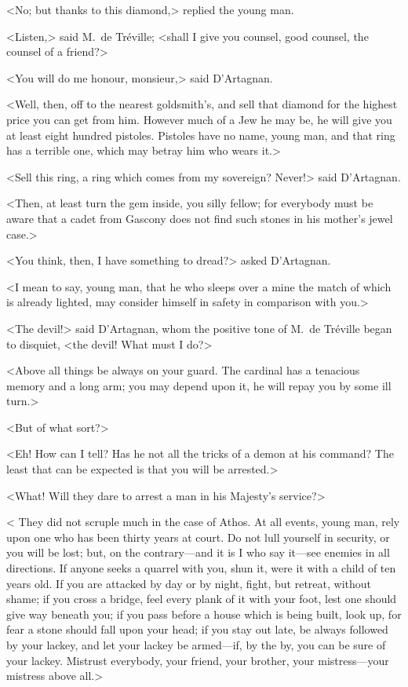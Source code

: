 <No; but thanks to this diamond,> replied the young man. 

<Listen,> said M.~de Tréville; <shall I give you counsel, good counsel, the counsel of a friend?> 

<You will do me honour, monsieur,> said D'Artagnan. 

<Well, then, off to the nearest goldsmith's, and sell that diamond for the highest price you can get from him. However much of a Jew he may be, he will give you at least eight hundred pistoles. Pistoles have no name, young man, and that ring has a terrible one, which may betray him who wears it.> 

<Sell this ring, a ring which comes from my sovereign? Never!> said D'Artagnan. 

<Then, at least turn the gem inside, you silly fellow; for everybody must be aware that a cadet from Gascony does not find such stones in his mother's jewel case.> 

<You think, then, I have something to dread?> asked D'Artagnan. 

<I mean to say, young man, that he who sleeps over a mine the match of which is already lighted, may consider himself in safety in comparison with you.> 

<The devil!> said D'Artagnan, whom the positive tone of M.~de Tréville began to disquiet, <the devil! What must I do?> 

<Above all things be always on your guard. The cardinal has a tenacious memory and a long arm; you may depend upon it, he will repay you by some ill turn.> 

<But of what sort?> 

<Eh! How can I tell? Has he not all the tricks of a demon at his command? The least that can be expected is that you will be arrested.> 

<What! Will they dare to arrest a man in his Majesty's service?> 

< They did not scruple much in the case of Athos. At all events, young man, rely upon one who has been thirty years at court. Do not lull yourself in security, or you will be lost; but, on the contrary—and it is I who say it—see enemies in all directions. If anyone seeks a quarrel with you, shun it, were it with a child of ten years old. If you are attacked by day or by night, fight, but retreat, without shame; if you cross a bridge, feel every plank of it with your foot, lest one should give way beneath you; if you pass before a house which is being built, look up, for fear a stone should fall upon your head; if you stay out late, be always followed by your lackey, and let your lackey be armed—if, by the by, you can be sure of your lackey. Mistrust everybody, your friend, your brother, your mistress—your mistress above all.> 

